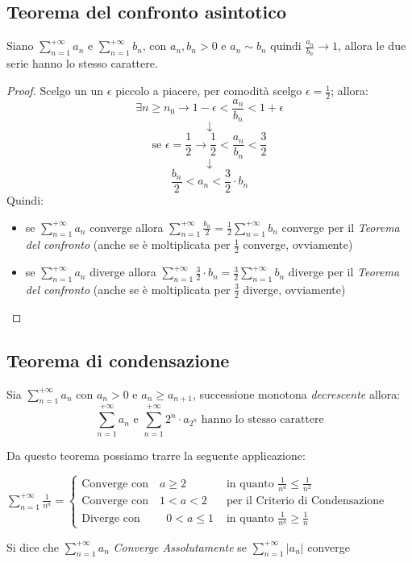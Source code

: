 \documentclass[a4paper,12pt, oneside]{book}
\begin{document}
\subsection{Teorema del confronto asintotico}
\begin{teorema}
Siano $\sum_{n=1}^{+\infty} a_n$ e $\sum_{n=1}^{+\infty} b_n$, con $a_n,b_n>0$ e $a_n\sim b_n \mbox{ quindi } \frac{a_n}{b_n}\rightarrow 1$, allora le due serie hanno lo stesso carattere.
\end{teorema}
\begin{proof}
Scelgo un un $\epsilon$ piccolo a piacere, per comodità scelgo $\epsilon=\frac{1}{2}$; allora:
$$\exists n\geq n_0\longrightarrow 1-\epsilon<\frac{a_n}{b_n}<1+\epsilon$$
$$\downarrow$$
$$\mbox{se  } \epsilon=\frac{1}{2}\longrightarrow \frac{1}{2}<\frac{a_n}{b_n}<\frac{3}{2}$$
$$\downarrow$$
$$\frac{b_n}{2}<a_n<\frac{3}{2}\cdot b_n$$
Quindi:
\begin{itemize}
\item se $\sum_{n=1}^{+\infty} a_n$ converge allora $\sum_{n=1}^{+\infty} \frac{b_n}{2} = \frac{1}{2}\sum_{n=1}^{+\infty} b_n$ converge per il \textit{Teorema del confronto} (anche se è moltiplicata per $\frac{1}{2}$ converge, ovviamente)
\item se $\sum_{n=1}^{+\infty} a_n$ diverge allora $\sum_{n=1}^{+\infty} \frac{3}{2}\cdot b_n = \frac{3}{2}\sum_{n=1}^{+\infty} b_n$ diverge per il \textit{Teorema del confronto} (anche se è moltiplicata per $\frac{3}{2}$ diverge, ovviamente)
\end{itemize}
\end{proof}
\subsection{Teorema di condensazione}
\begin{teorema}
Sia $\sum_{n=1}^{+\infty} a_n$ con $a_n>0$ e $a_n\geq a_{n+1}$, successione monotona \textit{decrescente} allora:
$$\sum_{n=1}^{+\infty} a_n \mbox{  e  } \sum_{n=1}^{+\infty} 2^n\cdot a_{2^n} \mbox{  hanno lo stesso carattere}$$
\end{teorema}
Da questo teorema possiamo trarre la seguente applicazione:
\begin{center}
 $\sum_{n=1}^{+\infty} \frac{1}{n^a}=\left\{
                \begin{array}{ll}
                \mbox{Converge con  } \mbox{ } a\geq 2 & \mbox{  in quanto  }\frac{1}{n^a}\leq \frac{1}{n^2}\\
                \mbox{Converge con  } \mbox{ } 1<a<2 & \mbox{  per il Criterio di Condensazione}\\
                \mbox{Diverge con   } \mbox{ } \mbox{ } \mbox{ } 0<a\leq 1 & \mbox{  in quanto  }\frac{1}{n^a}\geq \frac{1}{n}
				\end{array}
				\right.$
\end{center}
Si dice che $\sum_{n=1}^{+\infty} a_n$ \textit{Converge Assolutamente} se $\sum_{n=1}^{+\infty} |a_n|$ converge
\end{document}
